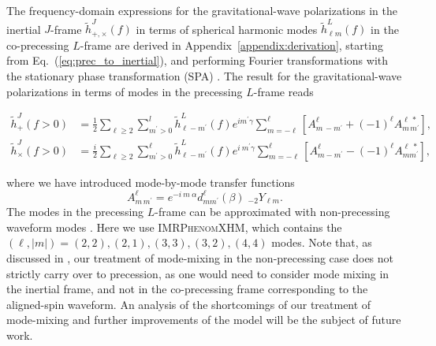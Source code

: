 \documentclass[%
aps,
prd,
amssymb,
amsmath,
amsfonts,
eqsecnum,
showpacs,
nofootinbib,
floatfix,
twocolumn,
twoside,
a4paper,
superscriptaddress
]{revtex4-1}
\newcommand{\mpr}{m^{\prime}}
\newcommand{\nl}{\newline}
\newcommand{\phXHM}{\textsc{IMRPhenomXHM}\xspace}
\begin{document}
The frequency-domain expressions for the gravitational-wave polarizations in the inertial $J$-frame $\tilde{h}_{+,\times}^J (f)$ in terms of spherical harmonic modes $\tilde{h}_{\ell m}^L (f)$ in the co-precessing $L$-frame are derived in Appendix~\ref{appendix:derivation}, starting from Eq.~(\ref{eq:prec_to_inertial}), and performing Fourier transformations with the stationary phase transformation (SPA)
\cite{Finn:1992xs,Cutler:1994ys,Droz:1999qx}.
The result for the gravitational-wave polarizations in terms of modes in the precessing $L$-frame reads
\begin{widetext}
\begin{align}
\label{eq:polarizations_1}
    \tilde{h}_{+}^{J} (f > 0) &= \frac{1}{2} \displaystyle\sum_{\ell \geq 2} \displaystyle\sum_{m^{\prime} > 0}^{l} \tilde{h}^{L}_{\ell  -m^{\prime}} (f) e^{ i \mpr \gamma} \displaystyle\sum_{m=-\ell}^{\ell}\left[ A^{\ell}_{m \, -\mpr} + (-1)^{\ell} A^{\ell \, \ast}_{m \, \mpr} \right], 
    \\
    \label{eq:polarizations_2}
    \tilde{h}_{\times}^{J} (f > 0) &= \frac{i}{2} \displaystyle\sum_{\ell \geq 2} \displaystyle\sum_{\mpr > 0}^{\ell} \tilde{h}^{L}_{\ell -\mpr } (f) e^{i \: \mpr \gamma} \displaystyle\sum_{m=-\ell}^{\ell} \left[ A^{\ell}_{m - \mpr} - (-1)^{\ell} A^{\ell\: \ast}_{m \mpr} \right],
\end{align}
\end{widetext}
where we have introduced mode-by-mode transfer functions 
\begin{equation}
   A^{\ell}_{m \, \mpr} =  e^{-i \: m \:\alpha} d^{\ell}_{m \mpr}(\beta) \; _{-2}Y_{\ell m}. 
\end{equation}
The modes in the precessing $L$-frame can be approximated with non-precessing waveform modes \cite{Schmidt:2010it,Schmidt:2012rh,Hannam:2013oca}. Here we use \phXHM \cite{Pratten:2020fqn,Garcia-Quiros:2020qpx}, which contains the $(\ell , |m|) = (2,2), (2,1), (3,3), (3,2), (4,4)$ modes.
Note that, as discussed in \cite{Ramos-Buades:2020noq}, our treatment of mode-mixing in the non-precessing case does not strictly carry over to precession, as one would need to consider mode mixing in the inertial frame, and not in the co-precessing frame corresponding to the aligned-spin waveform. An analysis of the shortcomings 
of our treatment of mode-mixing and further improvements of the model will be the subject of future work.
\end{document}

